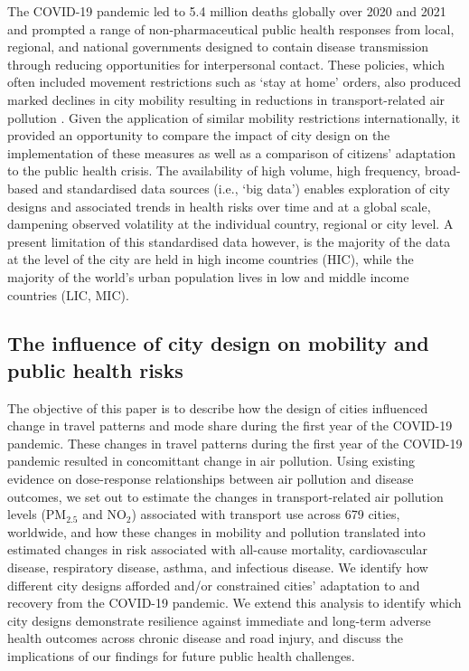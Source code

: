 \documentclass[preprint,10pt]{elsarticle} %
\begin{document}
The COVID-19 pandemic led to 5.4 million deaths globally over 2020 and 2021 \cite{Taylor2022} and prompted a range of non-pharmaceutical public health responses from local, regional, and national governments\cite{Hunter2023LPH} designed to contain disease transmission through reducing opportunities for interpersonal contact. These policies, which often included movement restrictions such as `stay at home' orders, also produced marked declines in city mobility resulting in reductions in transport-related air pollution \cite{Forster2020,He2020,LeQuere2020,Venter2020}. Given the application of similar mobility restrictions internationally, it provided an opportunity to compare the impact of city design on the implementation of these measures as well as a comparison of citizens' adaptation to the public health crisis. The availability of high volume, high frequency, broad-based and standardised data sources (i.e., `big data') enables exploration of city designs and associated trends in health risks over time and at a global scale, dampening observed volatility at the individual country, regional or city level. A present limitation of this standardised data however, is the majority of the data at the level of the city are held in high income countries (HIC), while the majority of the world's urban population lives in low and middle income countries (LIC, MIC)\cite{Smit2021}.

\subsection*{The influence of city design on mobility and public health risks}
The objective of this paper is to describe how the design of cities influenced change in travel patterns and mode share during the first year of the COVID-19 pandemic. These changes in travel patterns during the first year of the COVID-19 pandemic resulted in concomittant change in air pollution. Using existing evidence on dose-response relationships between air pollution and disease outcomes, we set out to estimate the changes in transport-related air pollution levels (PM$_{2.5}$ and NO$_{2}$) associated with transport use across 679 cities, worldwide, and how these changes in mobility and pollution translated into estimated changes in risk associated with all-cause mortality, cardiovascular disease, respiratory disease, asthma, and infectious disease. We identify how different city designs afforded and/or constrained cities' adaptation to and recovery from the COVID-19 pandemic. We extend this analysis to identify which city designs demonstrate  resilience against immediate and long-term adverse health outcomes across chronic disease and road injury, and discuss the implications of our findings for future public health challenges.
\end{document}
